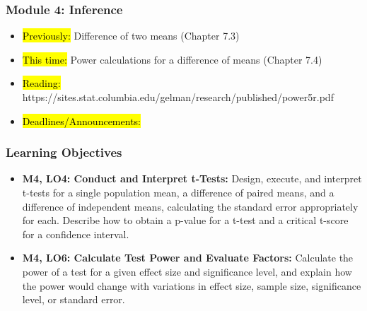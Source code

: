 
\begin{frame}
    \frametitle{Module 4: Inference}
    \begin{itemize}
        \item \hl{Previously: }Difference of two means (Chapter 7.3)
        \item \hl{This time: }Power calculations for a difference of means (Chapter 7.4)
        \item \hl{Reading: }https://sites.stat.columbia.edu/gelman/research/published/power5r.pdf
        \item \hl{Deadlines/Announcements: }
    \end{itemize}

\end{frame}

\begin{frame}
    \frametitle{Learning Objectives}
    \begin{itemize}
        \item \textbf{M4, LO4: Conduct and Interpret t-Tests:} Design, execute, and interpret t-tests for a single population mean, a difference of paired means, and a difference of independent means, calculating the standard error appropriately for each. Describe how to obtain a p-value for a t-test and a critical t-score for a confidence interval.
        \item \textbf{M4, LO6: Calculate Test Power and Evaluate Factors:} Calculate the power of a test for a given effect size and significance level, and explain how the power would change with variations in effect size, sample size, significance level, or standard error.
    \end{itemize}
\end{frame}
